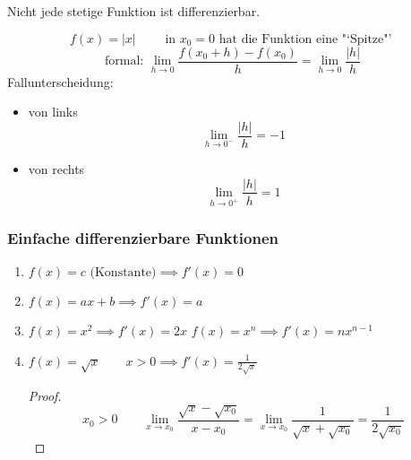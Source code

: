 \begin{theorem}
  Nicht jede stetige Funktion ist differenzierbar.
\end{theorem}

\begin{example}
\[	f(x)=|x| \qquad \text{ in } x_0=0 \text{ hat die Funktion eine "`Spitze"' } \]
\[	\text{formal: } \lim_{h \rightarrow 0}\frac{f(x_0+h)-f(x_0)}{h} = \lim_{h \rightarrow 0}\frac{|h|}{h}  \]
  Fallunterscheidung:
  \begin{itemize}
    \item von links \[\displaystyle\lim_{h \rightarrow 0^-}\frac{|h|}{h} = -1\]
    \item von rechts \[\displaystyle\lim_{h \rightarrow 0^+}\frac{|h|}{h} = 1\]
  \end{itemize}

\end{example}

\begin{center}
  \label{fig:Betragsfunktion}
\end{center}

\subsubsection*{Einfache differenzierbare Funktionen}
\begin{enumerate}
	\item \( f(x)=c \text{ (Konstante)} \implies f'(x)=0 \)
	\item \( f(x)=ax+b \implies f'(x)=a \)
	\item \(f(x)=x^2 \implies f'(x)=2x \)\newline
		  \(f(x)=x^n \implies f'(x)=nx^{n-1} \)
	\item \( f(x)=\sqrt{x} \qquad x>0 \implies f'(x)=\frac{1}{2\sqrt{x}} \)
	 \begin{proof}
	   \[ x_0>0 \qquad \lim_{x \rightarrow x_0}\frac{\sqrt{x}-\sqrt{x_0}}{x-x_0} =
            \lim_{x \rightarrow x_0}\frac{1}{\sqrt{x}+\sqrt{x_0}}=\frac{1}{2\sqrt{x_0}} \]
	 \end{proof}

\end{enumerate}


